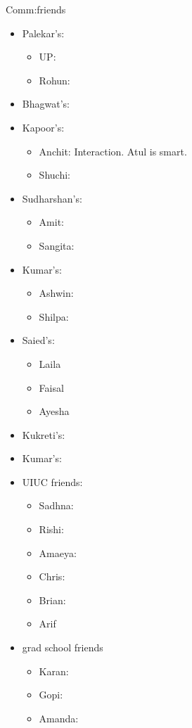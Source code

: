   \begin{block}{Comm:friends} 
    \begin{itemize} 
    \item Palekar’s:  
      \begin{itemize}
      \item UP: 
      \item Rohun: 
      \end{itemize} 
    \item Bhagwat’s: 
    \item Kapoor’s: 
      \begin{itemize}
        \tiny \item \tiny Anchit: Interaction. Atul is smart. 
      \item \tiny Shuchi: 
      \end{itemize}
    \item Sudharshan’s: 
      \begin{itemize} 
        \tiny \item \tiny Amit:  
      \item \tiny Sangita:  
      \end{itemize}
    \item Kumar’s:
      \begin{itemize}
        \tiny \item \tiny Ashwin: 
      \item \tiny Shilpa: 
      \end{itemize}
    \item Saied’s: 
      \begin{itemize}
        \tiny \item \tiny Laila 
      \item \tiny Faisal 
      \item \tiny Ayesha
      \end{itemize} 
    \item Kukreti’s:
    \item Kumar’s:
    \item UIUC friends: 
      \begin{itemize} 
        \tiny \item \tiny Sadhna: 
      \item \tiny Rishi: 
      \item \tiny Amaeya: 
      \item \tiny Chris: 
      \item \tiny Brian: 
      \item \tiny Arif 
      \end{itemize}
    \item grad school friends 
      \begin{itemize} 
        \tiny \item \tiny  Karan: 
      \item \tiny Gopi: 
      \item \tiny Amanda:  
      \end{itemize}
    \end{itemize} 
  \end{block}
  
